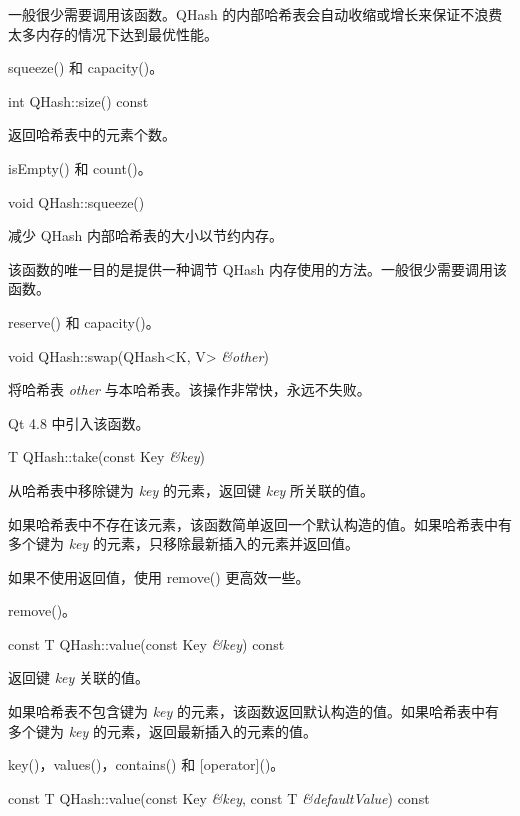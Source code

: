 一般很少需要调用该函数。QHash 的内部哈希表会自动收缩或增长来保证不浪费太多内存的情况下达到最优性能。

\begin{notice}[另请参阅]
squeeze() 和 capacity()。
\end{notice}

int QHash::size() const

返回哈希表中的元素个数。

\begin{notice}[另请参阅]
isEmpty() 和 count()。
\end{notice}

void QHash::squeeze()

减少 QHash 内部哈希表的大小以节约内存。

该函数的唯一目的是提供一种调节 QHash 内存使用的方法。一般很少需要调用该函数。

\begin{notice}[另请参阅]
reserve() 和 capacity()。
\end{notice}

void QHash::swap(QHash<K, V> \emph{\&other})

将哈希表 \emph{other} 与本哈希表。该操作非常快，永远不失败。

Qt 4.8 中引入该函数。

T QHash::take(const Key \emph{\&key})

从哈希表中移除键为 \emph{key} 的元素，返回键 \emph{key} 所关联的值。

如果哈希表中不存在该元素，该函数简单返回一个默认构造的值。如果哈希表中有多个键为 \emph{key} 的元素，只移除最新插入的元素并返回值。

如果不使用返回值，使用 remove() 更高效一些。

\begin{notice}[另请参阅]
remove()。
\end{notice}


const T QHash::value(const Key \emph{\&key}) const

返回键 \emph{key} 关联的值。

如果哈希表不包含键为 \emph{key} 的元素，该函数返回默认构造的值。如果哈希表中有多个键为 \emph{key} 的元素，返回最新插入的元素的值。


\begin{notice}[另请参阅]
key()，values()，contains() 和 [operator]()。
\end{notice}

const T QHash::value(const Key \emph{\&key}, const T \emph{\&defaultValue}) const


